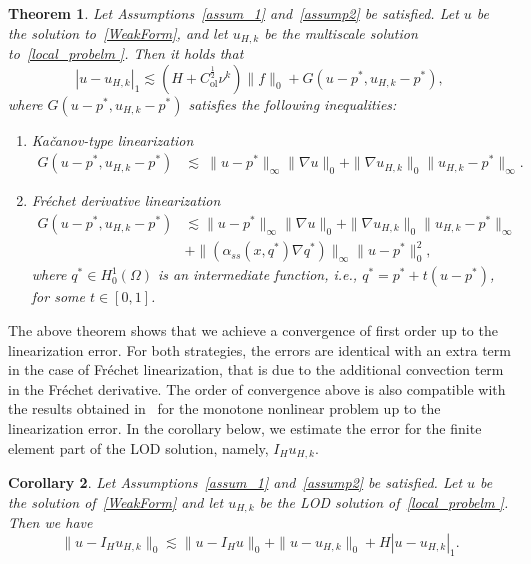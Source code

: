 \documentclass{article}
\newtheorem{theorem}{Theorem}
\newtheorem{corollary}[theorem]{Corollary}
\begin{document}
\begin{theorem}\label{DecayingBound}
 Let Assumptions~\ref{assum_1} and~\ref{assump2} be satisfied. Let $u$ be the solution to~\eqref{WeakForm}, and let $u_{H,k}$ be the multiscale solution to~\eqref{local_probelm }. Then it holds that
\[ |u-u_{H,k}|_1 \lesssim (H+{C_\mathrm{ol}^\frac{1}{2} \nu^k})\|f\|_0+G(u-p^*,u_{H,k}-p^*),\]
where $G(u-p^*,u_{H,k}-p^*)$ satisfies the following inequalities: 
\begin{enumerate}[label=(\alph*)]
    \item Kačanov-type linearization
    \begin{align*}
    G(u-p^*,u_{H,k}-p^*)& \lesssim\  {{\|u-p^*\|_\infty}}\|\nabla u\|_0 + \|\nabla u_{H,k}\|_0{\|u_{H,k}-p^*\|_\infty}. 
    \end{align*}
    \item Fréchet derivative linearization
\begin{align*}
   G(u-p^*,u_{H,k}-p^*)& \lesssim {\|u-p^*\|_\infty} \|\nabla u\|_0+ \|\nabla u_{H,k}\|_0 {\|u_{H,k}-p^*\|_\infty}\\
    &+ \|(\alpha_{ss}(x,q^*)\nabla q^*)\|_\infty{{\|u-p^*\|^2_0}}, 
    \end{align*}
where $q^* \in H^1_0(\Omega)$ is an intermediate function, i.e., $q^*=p^*+t(u-p^*)$, for some $t \in [0,1]$.
\end{enumerate}
\end{theorem}
The above theorem shows that we achieve a convergence of first order up to the linearization error. For both strategies, the errors are identical with an extra term in the case of Fréchet linearization, that is due to the additional convection term in the Fréchet derivative. The order of convergence above is also compatible with the results obtained in~\cite{Barbara} for the monotone nonlinear problem up to the linearization error. In the corollary below, we estimate the error for the finite element part of the LOD solution, namely, $I_Hu_{H,k}$.
\begin{corollary}\label{Corollary}
     Let Assumptions~\ref{assum_1} and~\ref{assump2} be satisfied. Let $u$ be the solution of~\eqref{WeakForm} and let $u_{H,k}$ be the LOD solution of~\eqref{local_probelm }. Then we have 
     \begin{equation}\label{L2Estimate}
         \|u-I_Hu_{H,k}\|_0\lesssim  \|u-I_Hu\|_0+\|u-u_{H,k}\|_0 +H|u-u_{H,k}|_1.
     \end{equation}
 \end{corollary}
 
\end{document}
